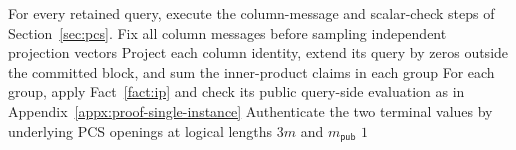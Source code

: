 \begin{algorithm}[!t]
For every retained query, execute the column-message and scalar-check
steps of Section~\ref{sec:pcs}.
Fix all column messages before sampling independent projection vectors\;
Project each column identity, extend its query by zeros outside
the committed block, and sum the inner-product claims in each group\;
For each group, apply Fact~\ref{fact:ip} and check its public
query-side evaluation as in Appendix~\ref{appx:proof-single-instance}\;
Authenticate the two terminal values by underlying PCS openings
at logical lengths \(3m\) and \(m_{\mathsf{pub}}\)\;
\Return \(1\)\;
\end{algorithm}
